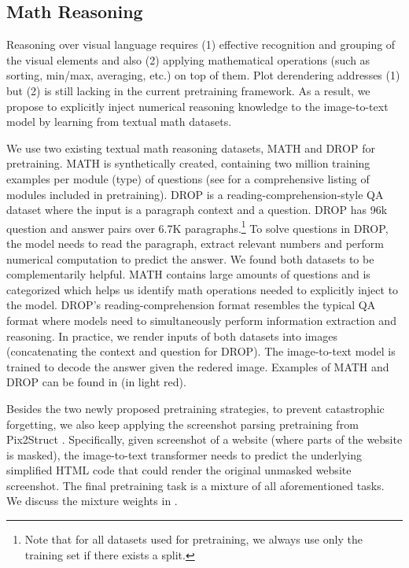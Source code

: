 \subsection{Math Reasoning}\label{sec:math_reasoning}
Reasoning over visual language requires (1) effective recognition and grouping of the visual elements and also (2) applying mathematical operations (such as sorting, min/max, averaging, etc.) on top of them. Plot derendering addresses (1) but (2) is still lacking in the current pretraining framework. As a result, we propose to explicitly inject numerical reasoning knowledge to the image-to-text model by learning from textual math datasets.

We use two existing textual math reasoning datasets, MATH \citep{saxton2019analysing} and DROP \citep{dua-etal-2019-drop} for pretraining. MATH is synthetically created, containing two million training examples per module (type) of questions (see  for a comprehensive listing of modules included in \model{} pretraining).
DROP is a reading-comprehension-style QA dataset where the input is a paragraph context and a question. DROP has 96k question and answer pairs over 6.7K paragraphs.\footnote{Note that for all datasets used for pretraining, we always use only the training set if there exists a split.} To solve questions in DROP, the model needs to read the paragraph, extract relevant numbers and perform numerical computation to predict the answer. We found both datasets to be complementarily helpful. MATH contains large amounts of questions and is categorized which helps us identify math operations needed to explicitly inject to the model. DROP's reading-comprehension format resembles the typical QA format where models need to simultaneously perform information extraction and reasoning. In practice, we render inputs of both datasets into images (concatenating the context and question for DROP). The image-to-text model is trained to decode the answer given the redered image. Examples of MATH and DROP can be found in  (in light red).

Besides the two newly proposed pretraining strategies, to prevent catastrophic forgetting, we also keep applying the screenshot parsing pretraining from Pix2Struct \citep{lee2022pix2struct}. Specifically, given screenshot of a website (where parts of the website is masked), the image-to-text transformer needs to predict the underlying simplified HTML code that could render the original unmasked website screenshot. The final pretraining task is a mixture of all aforementioned tasks. We discuss the mixture weights in .
